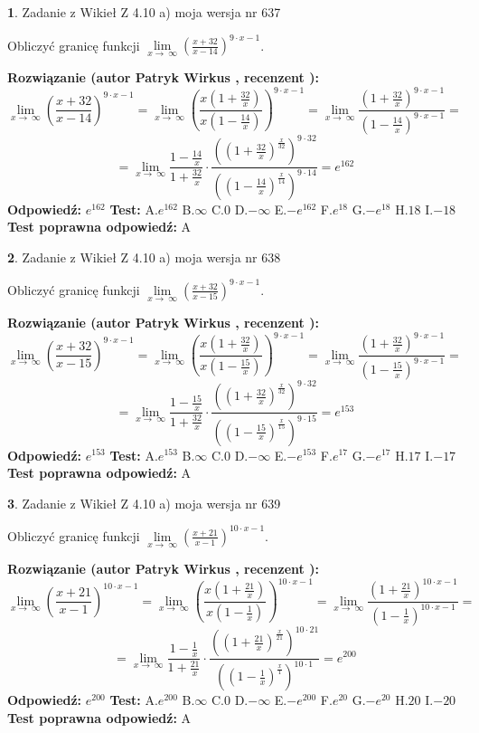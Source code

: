 \documentclass[12pt, a4paper]{article}
\theoremstyle{definition} %
\newtheorem{zad}{}
\newcommand{\zadStart}[1]{\begin{zad}#1\newline}
\newcommand{\zadStop}{\end{zad}}
\newcommand{\rozwStart}[2]{\noindent \textbf{Rozwiązanie (autor #1 , recenzent #2): }\newline}
\newcommand{\rozwStop}{\newline}
\newcommand{\odpStart}{\noindent \textbf{Odpowiedź:}\newline}
\newcommand{\odpStop}{\newline}
\newcommand{\testStart}{\noindent \textbf{Test:}\newline}
\newcommand{\testStop}{\newline}
\newcommand{\kluczStart}{\noindent \textbf{Test poprawna odpowiedź:}\newline}
\newcommand{\kluczStop}{\newline}
\begin{document}
\zadStart{Zadanie z Wikieł Z 4.10 a) moja wersja nr 637}

Obliczyć granicę funkcji  $\lim\limits_{x\to\ \infty}(\frac{x+32}{x-14})^{9\cdot x-1}$.
\zadStop
\rozwStart{Patryk Wirkus}{}
$$\lim\limits_{x\to\ \infty}(\frac{x+32}{x-14})^{9\cdot x-1} = \lim\limits_{x\to\ \infty}(\frac{x(1+\frac{32}{x})}{x(1-\frac{14}{x})})^{9\cdot x-1}=\lim\limits_{x\to\ \infty}\frac{(1+\frac{32}{x})^{9\cdot x-1}}{(1-\frac{14}{x})^{9\cdot x-1}}=$$
$$=\lim\limits_{x\to\ \infty}\frac{1-\frac{14}{x}}{1+\frac{32}{x}}\cdot\frac{((1+\frac{32}{x})^{\frac{x}{32}})^{9\cdot32}}{((1-\frac{14}{x})^{\frac{x}{14}})^{9\cdot14}}=e^{162}$$
\rozwStop
\odpStart
$e^{162}$
\odpStop
\testStart
A.$e^{162}$ B.$\infty$ C.$0$ D.$-\infty$ E.$-e^{162}$
F.$e^{18}$ G.$-e^{18}$
H.$18$
I.$-18$
\testStop
\kluczStart
A
\kluczStop



\zadStart{Zadanie z Wikieł Z 4.10 a) moja wersja nr 638}

Obliczyć granicę funkcji  $\lim\limits_{x\to\ \infty}(\frac{x+32}{x-15})^{9\cdot x-1}$.
\zadStop
\rozwStart{Patryk Wirkus}{}
$$\lim\limits_{x\to\ \infty}(\frac{x+32}{x-15})^{9\cdot x-1} = \lim\limits_{x\to\ \infty}(\frac{x(1+\frac{32}{x})}{x(1-\frac{15}{x})})^{9\cdot x-1}=\lim\limits_{x\to\ \infty}\frac{(1+\frac{32}{x})^{9\cdot x-1}}{(1-\frac{15}{x})^{9\cdot x-1}}=$$
$$=\lim\limits_{x\to\ \infty}\frac{1-\frac{15}{x}}{1+\frac{32}{x}}\cdot\frac{((1+\frac{32}{x})^{\frac{x}{32}})^{9\cdot32}}{((1-\frac{15}{x})^{\frac{x}{15}})^{9\cdot15}}=e^{153}$$
\rozwStop
\odpStart
$e^{153}$
\odpStop
\testStart
A.$e^{153}$ B.$\infty$ C.$0$ D.$-\infty$ E.$-e^{153}$
F.$e^{17}$ G.$-e^{17}$
H.$17$
I.$-17$
\testStop
\kluczStart
A
\kluczStop



\zadStart{Zadanie z Wikieł Z 4.10 a) moja wersja nr 639}

Obliczyć granicę funkcji  $\lim\limits_{x\to\ \infty}(\frac{x+21}{x-1})^{10\cdot x-1}$.
\zadStop
\rozwStart{Patryk Wirkus}{}
$$\lim\limits_{x\to\ \infty}(\frac{x+21}{x-1})^{10\cdot x-1} = \lim\limits_{x\to\ \infty}(\frac{x(1+\frac{21}{x})}{x(1-\frac{1}{x})})^{10\cdot x-1}=\lim\limits_{x\to\ \infty}\frac{(1+\frac{21}{x})^{10\cdot x-1}}{(1-\frac{1}{x})^{10\cdot x-1}}=$$
$$=\lim\limits_{x\to\ \infty}\frac{1-\frac{1}{x}}{1+\frac{21}{x}}\cdot\frac{((1+\frac{21}{x})^{\frac{x}{21}})^{10\cdot21}}{((1-\frac{1}{x})^{\frac{x}{1}})^{10\cdot1}}=e^{200}$$
\rozwStop
\odpStart
$e^{200}$
\odpStop
\testStart
A.$e^{200}$ B.$\infty$ C.$0$ D.$-\infty$ E.$-e^{200}$
F.$e^{20}$ G.$-e^{20}$
H.$20$
I.$-20$
\testStop
\kluczStart
A
\kluczStop
\end{document}
